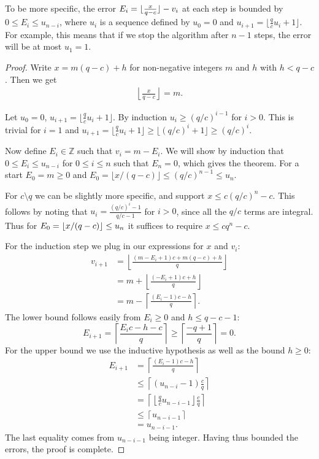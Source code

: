 To be more specific, the error $E_i = \lfloor {\frac{x}{q-c}} \rfloor - v_i$ at each step
is bounded by $0\le E_i\le u_{n-i}$,
where $u_i$ is a sequence defined by
$u_0=0$ and $u_{i+1} = \lfloor\frac{q}{c}u_i+1\rfloor$.
For example, this means that if we stop the algorithm after $n-1$ steps, the error will be at most $u_1=1$.
\begin{proof}
   Write $x = m(q-c)+h$ for non-negative integers $m$ and $h$ with $h<q-c$.
   Then we get
   \begin{align*}
      \left\lfloor\frac{x}{q-c}\right\rfloor = m.
      \label{eq:floor}
   \end{align*}

   Let $u_0=0$, $u_{i+1} = \lfloor\frac{q}{c}u_i+1\rfloor$.
   By induction $u_i \ge (q/c)^{i-1}$ for $i>0$.
   This is trivial for $i=1$ and $u_{i+1}=\lfloor \frac qc u_i +1\rfloor \ge \lfloor (q/c)^i + 1 \rfloor \ge (q/c)^i$.

   Now define $E_i\in\mathbb Z$ such that $v_i = m - E_i$.
   We will show by induction that $0\le E_{i} \le u_{n-i}$ for $0\le i\le n$ such that $E_n = 0$, which gives the theorem.
   For a start $E_0=m\ge 0$ and $E_0 = \lfloor x/(q-c)\rfloor \le (q/c)^{n-1} \le u_n$.

   For $c\setminus q$ we can be slightly more specific, and support $x \le c (q/c)^n-c$.
   This follows by noting that $u_i = \frac{(q/c)^i-1}{q/c-1}$ for $i>0$, since all the $q/c$ terms are integral.
   Thus for $E_0=\lfloor {x/(q-c)} \rfloor\le u_n$ it suffices to require $x\le c q^n-c$.

   For the induction step we plug in our expressions for $x$ and $v_i$:
   \begin{align*}
      v_{i+1}
      &= \left\lfloor \frac{(m-E_i+1)c+m(q-c)+h}{q}\right\rfloor
    \\&=
    m
    +
    \left\lfloor \frac{(- E_i+1)c +h}{q}\right\rfloor
    \\&=
    m
    - \left\lceil \frac{(E_i-1)c - h}{q}\right\rceil.
   \end{align*}
   The lower bound follows easily from $E_i \ge 0$ and $h\le q-c-1$:
   $$E_{i+1} = \left\lceil \frac{E_ic - h - c}{q}\right\rceil \ge
   \left\lceil \frac{- q + 1}{q}\right\rceil = 0.$$
   For the upper bound we use the inductive hypothesis as well as the bound $h\ge 0$:
   \begin{align*}
      E_{i+1}
      &= \left\lceil \frac{(E_i-1)c - h}{q}\right\rceil
    \\&\le\left\lceil (u_{n-i}-1)\frac{c}{q}\right\rceil
    \\&= \left\lceil \left\lfloor \frac{q}{c}u_{n-i-1} \right\rfloor \frac{c}{q}\right\rceil
    \\&\le \left\lceil u_{n-i-1}\right\rceil
    \\&= u_{n-i-1}.
   \end{align*}
   The last equality comes from $u_{n-i-1}$ being integer.
   Having thus bounded the errors, the proof is complete.
\end{proof}
